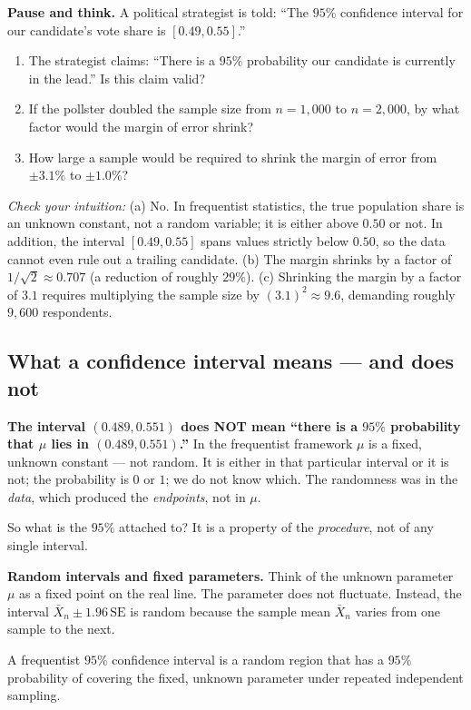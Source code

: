 \begin{recoverybox}
\textbf{Pause and think.} A political strategist is told: ``The $95\%$ confidence interval for our candidate's vote share is $[0.49, 0.55]$.''
\begin{enumerate}[label=(\alph*)]
  \item The strategist claims: ``There is a $95\%$ probability our candidate is currently in the lead.'' Is this claim valid?
  \item If the pollster doubled the sample size from $n=1{,}000$ to $n=2{,}000$, by what factor would the margin of error shrink?
  \item How large a sample would be required to shrink the margin of error from $\pm 3.1\%$ to $\pm 1.0\%$?
\end{enumerate}
\textit{Check your intuition:}
(a) No. In frequentist statistics, the true population share is an unknown constant, not a random variable; it is either above $0.50$ or not. In addition, the interval $[0.49, 0.55]$ spans values strictly below $0.50$, so the data cannot even rule out a trailing candidate.
(b) The margin shrinks by a factor of $1/\sqrt{2} \approx 0.707$ (a reduction of roughly $29\%$).
(c) Shrinking the margin by a factor of $3.1$ requires multiplying the sample size by $(3.1)^2 \approx 9.6$, demanding roughly $9{,}600$ respondents.
\end{recoverybox}

\subsection{What a confidence interval means --- and does not}

\begin{trapbox}
\textbf{The interval $(0.489, 0.551)$ does NOT mean ``there is a $95\%$ probability that
$\mu$ lies in $(0.489, 0.551)$.''} In the frequentist framework $\mu$ is a fixed,
unknown constant --- not random. It is either in that particular interval or it is not;
the probability is $0$ or $1$; we do not know which. The randomness was in the
\emph{data}, which produced the \emph{endpoints}, not in $\mu$.
\end{trapbox}

So what is the $95\%$ attached to? It is a property of the \emph{procedure}, not of any
single interval.

\begin{intuitionbox}
\textbf{Random intervals and fixed parameters.}
Think of the unknown parameter $\mu$ as a fixed point on the real line. The parameter does
not fluctuate. Instead, the interval $\bar X_n \pm 1.96\,\mathrm{SE}$ is random because the sample
mean $\bar X_n$ varies from one sample to the next.

A frequentist $95\%$ confidence interval is a random region that has a $95\%$ probability of
covering the fixed, unknown parameter under repeated independent sampling.
\end{intuitionbox}

